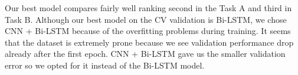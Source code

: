 \documentclass[10pt, a4paper]{article}
\begin{document}
Our best model compares fairly well ranking second in the Task A and third in
Task B. Although our best model on the CV validation is Bi-LSTM, we chose 
CNN + Bi-LSTM because of the overfitting problems during training. It seems that
the dataset is extremely prone because we see validation performance drop
already after the first epoch. CNN + Bi-LSTM gave us the smaller validation
error so we opted for it instead of the Bi-LSTM model.







\end{document}
